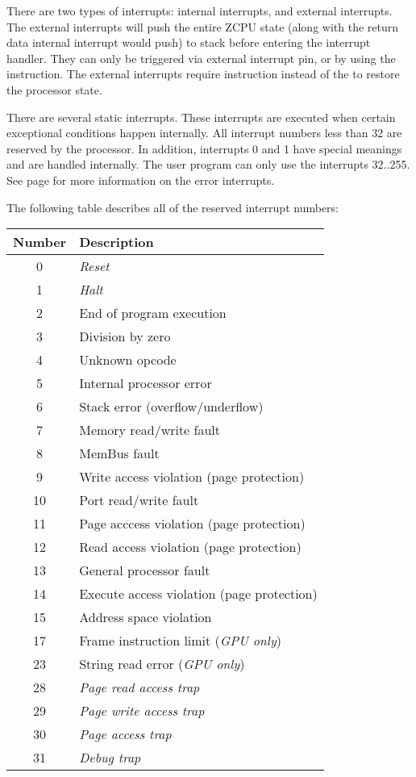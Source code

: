 There are two types of interrupts: internal interrupts, and external interrupts. The external interrupts will push the entire ZCPU state (along with the return data internal interrupt would push) to stack before entering the interrupt handler. They can only be triggered via external interrupt pin, or by using the  instruction. The external interrupts require  instruction instead of the  to restore the processor state.

There are several static interrupts. These interrupts are executed when certain exceptional conditions happen internally. All interrupt numbers less than 32 are reserved by the processor. In addition, interrupts 0 and 1 have special meanings and are handled internally. The user program can only use the interrupts 32..255. See page \pageref{errorcodes} for more information on the error interrupts.

The following table describes all of the reserved interrupt numbers:

\singlespacing
\begin{longtable}{|c|p{3.5in}|} \hline
Number & Description \\ \hline
0 & \emph{Reset} \\ \hline
1 & \emph{Halt} \\ \hline
2 & End of program execution \\ \hline
3 & Division by zero \\ \hline
4 & Unknown opcode \\ \hline
5 & Internal processor error \\ \hline
6 & Stack error (overflow/underflow) \\ \hline
7 & Memory read/write fault \\ \hline
8 & MemBus fault \\ \hline
9 & Write access violation (page protection) \\ \hline
10 & Port read/write fault \\ \hline
11 & Page acccess violation (page protection) \\ \hline
12 & Read access violation (page protection) \\ \hline
13 & General processor fault \\ \hline
14 & Execute access violation (page protection) \\ \hline
15 & Address space violation \\ \hline
17 & Frame instruction limit (\emph{GPU only}) \\ \hline
23 & String read error (\emph{GPU only}) \\ \hline
28 & \emph{Page read access trap} \\ \hline
29 & \emph{Page write access trap} \\ \hline
30 & \emph{Page access trap} \\ \hline
31 & \emph{Debug trap} \\ \hline
\end{longtable}
\onehalfspacing

